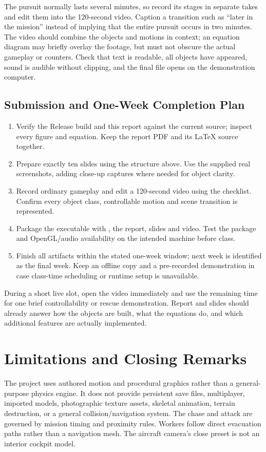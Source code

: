The pursuit normally lasts several minutes, so record its stages in separate takes and edit them into the 120-second video. Caption a transition such as ``later in the mission'' instead of implying that the entire pursuit occurs in two minutes. The video should combine the objects and motions in context; an equation diagram may briefly overlay the footage, but must not obscure the actual gameplay or counters. Check that text is readable, all objects have appeared, sound is audible without clipping, and the final file opens on the demonstration computer.

\subsection{Submission and One-Week Completion Plan}
\begin{enumerate}
\item Verify the Release build and this report against the current source; inspect every figure and equation. Keep the report PDF and its LaTeX source together.
\item Prepare exactly ten slides using the structure above. Use the supplied real screenshots, adding close-up captures where needed for object clarity.
\item Record ordinary gameplay and edit a 120-second video using the checklist. Confirm every object class, controllable motion and scene transition is represented.
\item Package the executable with , the report, slides and video. Test the package and OpenGL/audio availability on the intended machine before class.
\item Finish all artifacts within the stated one-week window; next week is identified as the final week. Keep an offline copy and a pre-recorded demonstration in case class-time scheduling or runtime setup is unavailable.
\end{enumerate}
During a short live slot, open the video immediately and use the remaining time for one brief controllability or rescue demonstration. Report and slides should already answer how the objects are built, what the equations do, and which additional features are actually implemented.

\section{Limitations and Closing Remarks}
The project uses authored motion and procedural graphics rather than a general-purpose physics engine. It does not provide persistent save files, multiplayer, imported models, photographic texture assets, skeletal animation, terrain destruction, or a general collision/navigation system. The chase and attack are governed by mission timing and proximity rules. Workers follow direct evacuation paths rather than a navigation mesh. The aircraft camera's close preset is not an interior cockpit model.

